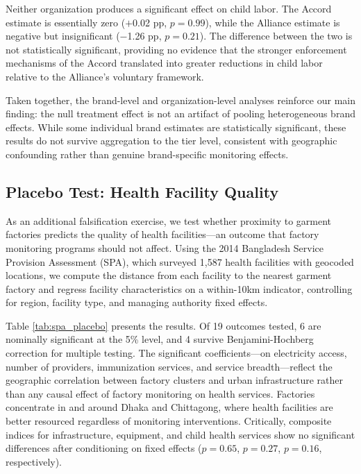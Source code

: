 \documentclass[12pt]{article}
\begin{document}
Neither organization produces a significant effect on child labor. The Accord estimate is essentially zero ($+$0.02 pp, $p = 0.99$), while the Alliance estimate is negative but insignificant ($-$1.26 pp, $p = 0.21$). The difference between the two is not statistically significant, providing no evidence that the stronger enforcement mechanisms of the Accord translated into greater reductions in child labor relative to the Alliance's voluntary framework.

Taken together, the brand-level and organization-level analyses reinforce our main finding: the null treatment effect is not an artifact of pooling heterogeneous brand effects. While some individual brand estimates are statistically significant, these results do not survive aggregation to the tier level, consistent with geographic confounding rather than genuine brand-specific monitoring effects.


\subsection{Placebo Test: Health Facility Quality}

As an additional falsification exercise, we test whether proximity to garment factories predicts the quality of health facilities---an outcome that factory monitoring programs should not affect. Using the 2014 Bangladesh Service Provision Assessment (SPA), which surveyed 1,587 health facilities with geocoded locations, we compute the distance from each facility to the nearest garment factory and regress facility characteristics on a within-10km indicator, controlling for region, facility type, and managing authority fixed effects.

Table \ref{tab:spa_placebo} presents the results. Of 19 outcomes tested, 6 are nominally significant at the 5\% level, and 4 survive Benjamini-Hochberg correction for multiple testing. The significant coefficients---on electricity access, number of providers, immunization services, and service breadth---reflect the geographic correlation between factory clusters and urban infrastructure rather than any causal effect of factory monitoring on health services. Factories concentrate in and around Dhaka and Chittagong, where health facilities are better resourced regardless of monitoring interventions. Critically, composite indices for infrastructure, equipment, and child health services show no significant differences after conditioning on fixed effects ($p = 0.65$, $p = 0.27$, $p = 0.16$, respectively).
\end{document}

